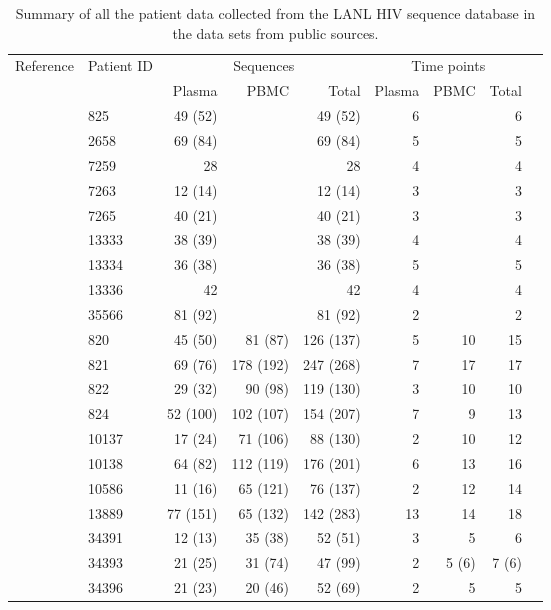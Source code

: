 \documentclass[12pt]{article}
\begin{document}
\begin{table*}
\caption{Summary of all the patient data collected from the LANL HIV sequence database \cite{LosAlamos} in the data sets from public sources.\label{tab:patients}}
\def\arraystretch{1.3}%
\begin{center}
\begin{tabular}{llrrrrrrr} 

Reference & Patient ID & \multicolumn{3}{c}{Sequences} & \multicolumn{3}{c}{Time points} \\
 &  & Plasma & PBMC & Total & Plasma & PBMC & Total\\
\hline
\cite{Shankarappa99} & 825 & 49 (52) & & 49 (52) & 6 & & 6 \\
\cite{Simmonds91} & 2658 & 69 (84) & & 69 (84) & 5 & & 5 \\
\cite{Edwards06} & 7259 & 28 & & 28 & 4 & & 4 \\
& 7263 & 12 (14) & & 12 (14) & 3 & & 3 \\
& 7265 & 40 (21) & & 40 (21) & 3 & & 3 \\
& 13333 & 38 (39) & & 38 (39) & 4 & & 4 \\
& 13334 & 36 (38) & & 36 (38) & 5 & & 5 \\
& 13336 & 42 & & 42 & 4 & & 4 \\
\cite{Schnell10} & 35566 & 81 (92) & & 81 (92) & 2 & & 2 \\
\hline
\cite{Shankarappa99} & 820 & 45 (50) & 81 (87) & 126 (137) & 5 & 10 & 15 \\
& 821 & 69 (76) & 178 (192) & 247 (268) & 7 & 17 & 17 \\ 
& 822 & 29 (32) & 90 (98) & 119 (130) & 3 & 10 & 10 \\ 
& 824 & 52 (100) & 102 (107) & 154 (207) & 7 & 9 & 13 \\
& 10137 & 17 (24) & 71 (106) & 88 (130) & 2 & 10 & 12 \\
& 10138 & 64 (82) & 112 (119) & 176 (201) & 6 & 13 & 16 \\
& 10586 & 11 (16) & 65 (121) & 76 (137) & 2 & 12 & 14 \\ 
& 13889 & 77 (151) & 65 (132) & 142 (283) & 13 & 14 & 18 \\
\cite{Novitsky09}%
& 34391 & 12 (13) & 35 (38) & 52 (51) & 3 & 5 & 6 \\
& 34393 & 21 (25) & 31 (74) & 47 (99) & 2 & 5 (6) & 7 (6) \\
& 34396 & 21 (23) & 20 (46) & 52 (69) & 2 & 5 & 5 \\

\end{tabular}
\end{center}
\end{table*}
\end{document}
